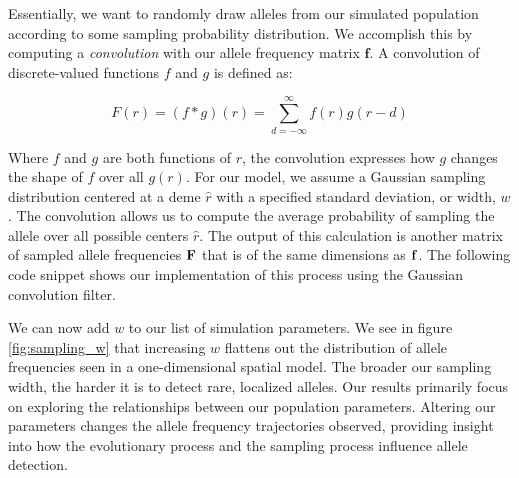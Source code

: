 Essentially, we want to randomly draw alleles from our simulated population according to some sampling probability distribution. We accomplish this by computing a \textit{convolution} with our allele frequency matrix $\textbf{f}$. A convolution of discrete-valued functions $f$ and $g$ is defined as:

\begin{equation}\label{eq:convolution}
    F(r) = (f*g)(r) = \sum_{d=-\infty}^\infty f(r)g(r-d)
\end{equation}


Where $f$ and $g$ are both functions of $r$, the convolution expresses how $g$ changes the shape of $f$ over all $g(r)$. For our model, we assume a Gaussian sampling distribution centered at a deme $\hat{r}$ with a specified standard deviation, or width, $w$. The convolution allows us to compute the average probability of sampling the allele over all possible centers $\hat{r}$. The output of this calculation is another matrix of sampled allele frequencies $\bf{F}$ that is of the same dimensions as $\bf{f}$. The following code snippet shows our implementation of this process using the  Gaussian convolution filter. 





We can now add $w$ to our list of simulation parameters. We see in figure \ref{fig:sampling_w} that increasing $w$ flattens out the distribution of allele frequencies seen in a one-dimensional spatial model. The broader our sampling width, the harder it is to detect rare, localized alleles. Our results primarily focus on exploring the relationships between our population parameters. Altering our parameters changes the allele frequency trajectories observed, providing insight into how the evolutionary process and the sampling process influence allele detection.    

